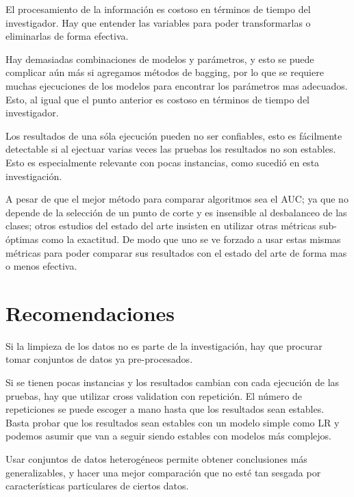 El procesamiento de la información es costoso en términos de tiempo del investigador. Hay que entender las variables para poder transformarlas o eliminarlas de forma efectiva.

Hay demasiadas combinaciones de modelos y parámetros, y esto se puede complicar aún más si agregamos métodos de bagging, por lo que se requiere muchas ejecuciones de los modelos para encontrar los parámetros mas adecuados. Esto, al igual que el punto anterior es costoso en términos de tiempo del investigador.

Los resultados de una sóla ejecución pueden no ser confiables, esto es fácilmente detectable si al ejectuar varias veces las pruebas los resultados no son estables. Esto es especialmente relevante con pocas instancias, como sucedió en esta investigación.

A pesar de que el mejor método para comparar algoritmos sea el AUC; ya que no depende de la selección de un punto de corte y es insensible al desbalanceo de las clases; otros estudios del estado del arte insisten en utilizar otras métricas sub-óptimas como la exactitud. De modo que uno se ve forzado a usar estas mismas métricas para poder comparar sus resultados con el estado del arte de forma mas o menos efectiva.


\section{Recomendaciones}

Si la limpieza de los datos no es parte de la investigación, hay que procurar tomar conjuntos de datos ya pre-procesados.

Si se tienen pocas instancias y los resultados cambian con cada ejecución de las pruebas, hay que utilizar cross validation con repetición. El número de repeticiones se puede escoger a mano hasta que los resultados sean estables. Basta probar que los resultados sean estables con un modelo simple como \ac{LR} y podemos asumir que van a seguir siendo estables con modelos más complejos.

Usar conjuntos de datos heterogéneos permite obtener conclusiones más generalizables, y hacer una mejor comparación que no esté tan sesgada por características particulares de ciertos datos.


